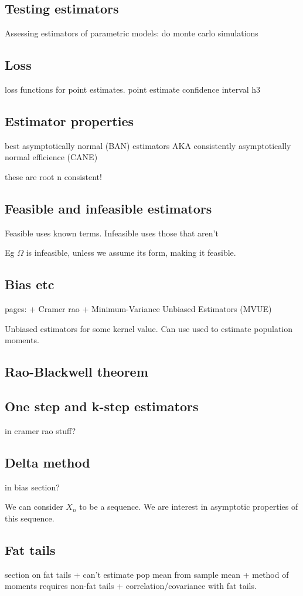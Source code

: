 
\subsection{Testing estimators}

Assessing estimators of parametric models: do monte carlo simulations


\subsection{Loss}

loss functions for point estimates.
point estimate confidence interval h3

\subsection{Estimator properties}

best asymptotically normal (BAN) estimators
AKA consistently asymptotically normal efficience (CANE)

these are root n consistent!

\subsection{Feasible and infeasible estimators}

Feasible uses known terms. Infeasible uses those that aren't

Eg \(\Omega \) is infeasible, unless we assume its form, making it feasible.

\subsection{Bias etc}

pages:
+ Cramer rao
+ Minimum-Variance Unbiased Estimators (MVUE)

Unbiased estimators for some kernel value. Can use used to estimate population moments.

\subsection{Rao-Blackwell theorem}

\subsection{One step and k-step estimators}
in cramer rao stuff?
\subsection{Delta method}
in bias section?

We can consider \(X_n\) to be a sequence. We are interest in asymptotic properties of this sequence.

\subsection{Fat tails}

section on fat tails
+ can't estimate pop mean from sample mean
+ method of moments requires non-fat tails
+ correlation/covariance with fat tails.

